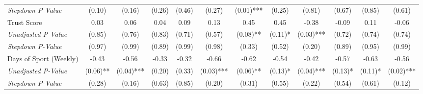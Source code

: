 \begin{tabular}{l c c c c c c c c c c c}
\quad \textit{Stepdown P-Value} & (0.10) & (0.16) & (0.26) & (0.46) & (0.27) & (0.01)*** & (0.25) & (0.81) & (0.67) & (0.85) & (0.61) \\
Trust Score & 0.03 & 0.06 & 0.04 & 0.09 & 0.13 & 0.45 & 0.45 & -0.38 & -0.09 & 0.11 & -0.06 \\
\quad \textit{Unadjusted P-Value} & (0.85) & (0.76) & (0.83) & (0.71) & (0.57) & (0.08)** & (0.11)* & (0.03)*** & (0.72) & (0.74) & (0.74) \\
\quad \textit{Stepdown P-Value} & (0.97) & (0.99) & (0.89) & (0.99) & (0.98) & (0.33) & (0.52) & (0.20) & (0.89) & (0.95) & (0.99) \\
Days of Sport (Weekly) & -0.43 & -0.56 & -0.33 & -0.32 & -0.66 & -0.62 & -0.54 & -0.42 & -0.57 & -0.63 & -0.56 \\
\quad \textit{Unadjusted P-Value} & (0.06)** & (0.04)*** & (0.20) & (0.33) & (0.03)*** & (0.06)** & (0.13)* & (0.04)*** & (0.13)* & (0.11)* & (0.02)*** \\
\quad \textit{Stepdown P-Value} & (0.28) & (0.16) & (0.63) & (0.85) & (0.20) & (0.31) & (0.55) & (0.22) & (0.54) & (0.61) & (0.12) \\
\bottomrule
\end{tabular}
